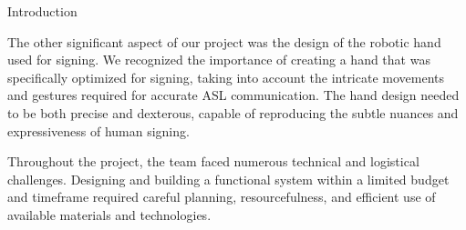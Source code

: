 \documentclass[final, 20pt]{beamer}
\newlength{\colwidth}
\newlength{\twocolwidth}
\begin{document}
\begin{frame}[t]
\begin{columns}[t]
\begin{column}{\twocolwidth}
\begin{block}{Introduction}
\begin{multicols}{2}
          The other significant aspect of our project was the design of the robotic hand used for signing. We recognized the importance of creating a hand that was specifically optimized for signing, taking into account the intricate movements and gestures required for accurate ASL communication. The hand design needed to be both precise and dexterous, capable of reproducing the subtle nuances and expressiveness of human signing.

          Throughout the project, the team faced numerous technical and logistical challenges. Designing and building a functional system within a limited budget and timeframe required careful planning, resourcefulness, and efficient use of available materials and technologies.


        \end{multicols}
      \end{block}


\end{column}
\end{columns}
\end{frame}
\end{document}
